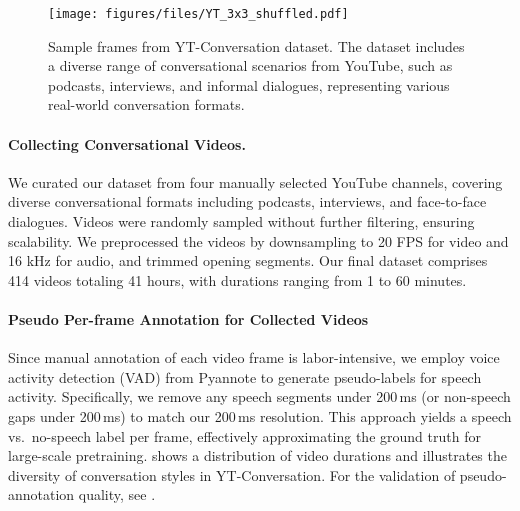 \begin{figure}[t]
\centering
\texttt{[image: figures/files/YT\_3x3\_shuffled.pdf]}
\caption{Sample frames from YT-Conversation dataset. The dataset includes a diverse range of conversational scenarios from YouTube, such as podcasts, interviews, and informal dialogues, representing various real-world conversation formats.}
\vspace*{-1em}
\end{figure}

\paragraph{Collecting Conversational Videos.}

We curated our dataset from four manually selected YouTube channels, covering diverse conversational formats including podcasts, interviews, and face-to-face dialogues. Videos were randomly sampled without further filtering, ensuring scalability.  
We preprocessed the videos by downsampling to 20 FPS for video and 16 kHz for audio, and trimmed opening segments. Our final dataset comprises 414 videos totaling 41 hours, with durations ranging from 1 to 60 minutes. 




\paragraph{Pseudo Per-frame Annotation for Collected Videos}

Since manual annotation of each video frame is labor-intensive, we employ voice activity detection (VAD) from Pyannote \cite{Plaquet23powerset, Bredin23pyanote} to generate pseudo-labels for speech activity. Specifically, we remove any speech segments under 200\,ms 
(or non-speech gaps under 200\,ms) to match our 200\,ms resolution. This approach yields 
a speech vs.\ no-speech label per frame, effectively approximating the ground truth 
for large-scale pretraining.  shows a distribution of 
video durations and illustrates the diversity of conversation styles in YT-Conversation. For the validation of pseudo-annotation quality, see .


